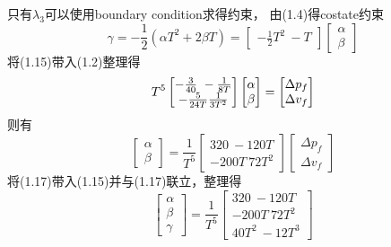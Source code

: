 \documentclass[40pt,a4paper,UTF8]{ctexart}
\numberwithin{equation}{section}
\begin{document}
\begin{enumerate}
\begin{enumerate}
只有$\lambda_3$可以使用boundary condition求得约束，
由(1.4)得costate约束
\begin{equation}
\gamma = -\frac{1}{2}(\alpha T^2 + 2\beta T)
=\begin{bmatrix}
    -\frac{1}{2}T^2 \ -T
\end{bmatrix}
\begin{bmatrix}
    \alpha \\ \beta
\end{bmatrix}
\end{equation}
将(1.15)带入(1.2)整理得
\begin{equation}
    T^5
    \begin{bmatrix}
        -\frac{3}{40}\ -\frac{1}{8T}\\ -\frac{5}{24T}\-\frac{1}{3T^2}
    \end{bmatrix}
    \begin{bmatrix}
        \alpha \\ \beta
    \end{bmatrix} 
    =
    \begin{bmatrix}
        \Delta p_f \\ \Delta v_f
    \end{bmatrix} 
\end{equation}
则有
\begin{equation}
    \begin{bmatrix}
        \alpha \\ \beta
    \end{bmatrix}  
    = \frac{1}{T^5}
    \begin{bmatrix}
        320 \ -120T \\ -200T \ 72T^2
    \end{bmatrix}
    \begin{bmatrix}
        \Delta p_f\\ \Delta v_f
    \end{bmatrix}
\end{equation}
将(1.17)带入(1.15)并与(1.17)联立，整理得
\begin{equation}
    \begin{bmatrix}
        \alpha \\ \beta \\ \gamma
    \end{bmatrix}
    =
    \frac{1}{T^5}
    \begin{bmatrix}
        320 \ -120T \\
        -200T \ 72T^2 \\
        40T^2 \ -12T^3
    \end{bmatrix}

\end{equation}
\end{enumerate}
\end{enumerate}
\end{document}
